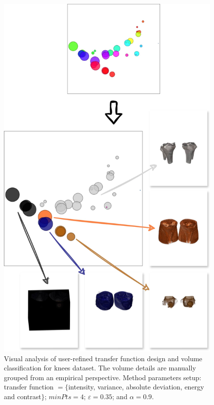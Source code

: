 \begin{figure}[htb!]
    \centering
    \includegraphics[width=\columnwidth]{figs/knees-groups.jpg}
    \caption{Visual analysis of user-refined transfer function design and volume classification for knees dataset. The volume details are manually grouped from an empirical perspective. Method parameters setup: transfer function $=\{$intensity,  variance, absolute deviation, energy and contrast$\}$; $minPts = 4$; $\varepsilon = 0.35$; and $\alpha = 0.9$.}
    \label{fig:knees-groups}
\end{figure}




